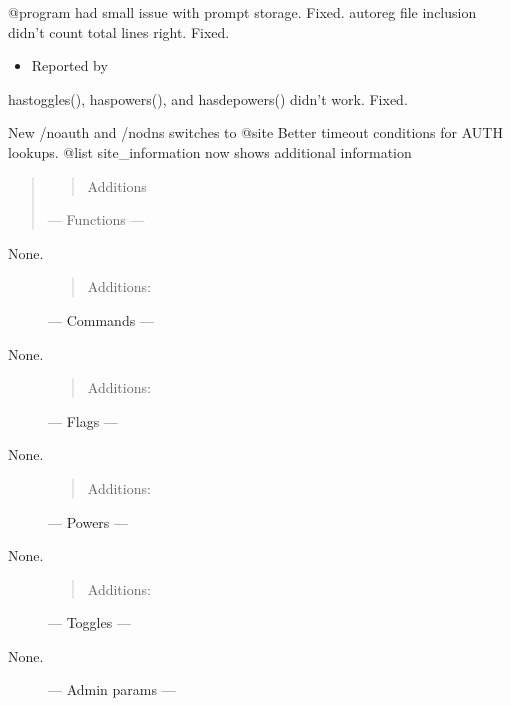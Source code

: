 \documentclass[letterpaper,10pt,english]{sphinxmanual}
\begin{document}
\sphinxAtStartPar
@program had small issue with prompt storage.  Fixed.
autoreg file inclusion didn’t count total lines right.  Fixed.
\begin{itemize}
\item {} 
\sphinxAtStartPar
Reported by 

\end{itemize}

\sphinxAtStartPar
hastoggles(), haspowers(), and hasdepowers() didn’t work.  Fixed.

\sphinxAtStartPar
New /noauth and /nodns switches to @site
Better timeout conditions for AUTH lookups.
@list site\_information now shows additional information
\begin{quote}
\begin{quote}

\sphinxAtStartPar
Additions
\end{quote}

\sphinxAtStartPar
— Functions —
\end{quote}
\begin{description}
\item[{None.}] \leavevmode\begin{quote}

\sphinxAtStartPar
Additions:
\end{quote}

\sphinxAtStartPar
— Commands —

\item[{None.}] \leavevmode\begin{quote}

\sphinxAtStartPar
Additions:
\end{quote}

\sphinxAtStartPar
— Flags —

\item[{None.}] \leavevmode\begin{quote}

\sphinxAtStartPar
Additions:
\end{quote}

\sphinxAtStartPar
— Powers —

\item[{None.}] \leavevmode\begin{quote}

\sphinxAtStartPar
Additions:
\end{quote}

\sphinxAtStartPar
— Toggles —

\item[{None.}] \leavevmode
\sphinxAtStartPar
— Admin params —

\end{description}
\end{document}
